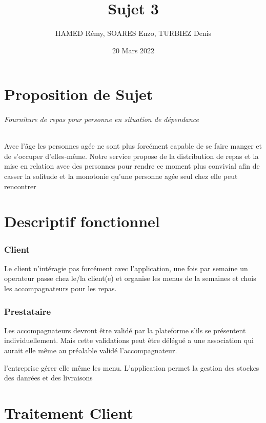 \documentclass[a4paper,12pt]{article}
\title{Sujet 3}
\author{HAMED Rémy, SOARES Enzo, TURBIEZ Denis}
\date{20 Mars 2022}
\begin{document}
\maketitle
\newpage

\tableofcontents

\newpage
\part{Proposition de Sujet}

\paragraph{Fourniture de repas pour personne en situation de dépendance}
Avec l'âge les personnes agée ne sont plus forcément capable de se faire manger et de s'occuper d'elles-même. Notre service propose de la distribution de repas et la mise en relation avec des personnes pour rendre ce moment plus convivial afin de casser la solitude et la monotonie qu'une personne agée seul chez elle peut rencontrer

\newpage
\part{Descriptif fonctionnel}

\section{Client}
Le client n'intéragie pas forcément avec l'application, une fois par semaine un operateur passe chez le/la client(e) et organise les menus de la semaines et chois les accompagnateurs pour les repas.

\section{Prestataire}
Les accompagnateurs devront être validé par la plateforme s'ils se présentent individuellement. Mais cette validations peut être délégué a une association qui aurait elle même au préalable validé l'accompagnateur.

l'entreprise gérer elle même les menu. L'application permet la gestion des stockes des danrées et des livraisons

\newpage
\part{Traitement Client}
\end{document}

